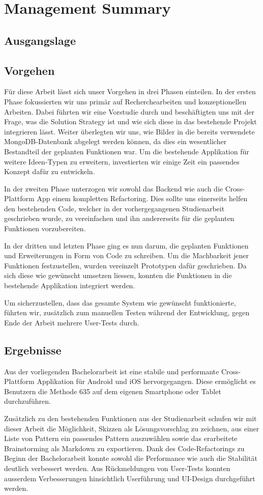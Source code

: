 \section{Management Summary}

\subsection{Ausgangslage}

\subsection{Vorgehen}
Für diese Arbeit lässt sich unser Vorgehen in drei Phasen einteilen. In der ersten Phase fokussierten wir uns primär auf Recherchearbeiten und konzeptionellen Arbeiten. Dabei führten wir eine Vorstudie durch und beschäftigten uns mit der Frage, was die Solution Strategy ist und wie sich diese in das bestehende Projekt integrieren lässt. Weiter überlegten wir uns, wie Bilder in die bereits verwendete MongoDB-Datenbank abgelegt werden können, da dies ein wesentlicher Bestandteil der geplanten Funktionen war. Um die bestehende Applikation für weitere Ideen-Typen zu erweitern, investierten wir einige Zeit ein passendes Konzept dafür zu entwickeln.

In der zweiten Phase unterzogen wir sowohl das Backend wie auch die Cross-Plattform App einem kompletten Refactoring. Dies sollte uns einerseits helfen den bestehenden Code, welcher in der vorhergegangenen Studienarbeit geschrieben wurde, zu vereinfachen und ihn andererseits für die geplanten Funktionen vorzubereiten.

In der dritten und letzten Phase ging es nun darum, die geplanten Funktionen und Erweiterungen in Form von Code zu schreiben. Um die Machbarkeit jener Funktionen festzustellen, wurden vereinzelt Prototypen dafür geschrieben. Da sich diese wie gewünscht umsetzen liessen, konnten die Funktionen in die bestehende Applikation integriert werden. 

Um sicherzustellen, dass das gesamte System wie gewünscht funktionierte, führten wir, zusätzlich zum manuellen Testen während der Entwicklung, gegen Ende der Arbeit mehrere User-Tests durch.

\subsection{Ergebnisse}
Aus der vorliegenden Bachelorarbeit ist eine stabile und performante Cross-Plattform Applikation für Android und iOS hervorgegangen. Diese ermöglicht es Benutzern die Methode 635 auf dem eigenen Smartphone oder Tablet durchzuführen.

Zusätzlich zu den bestehenden Funktionen aus der Studienarbeit schufen wir mit dieser Arbeit die Möglichkeit, Skizzen als Lösungsvorschlag zu zeichnen, aus einer Liste von Pattern ein passendes Pattern auszuwählen sowie das erarbeitete Brainstorming als Markdown zu exportieren. Dank des Code-Refactorings zu Beginn der Bachelorarbeit konnte sowohl die Performance wie auch die Stabilität deutlich verbessert werden. Aus Rückmeldungen von User-Tests konnten ausserdem Verbesserungen hinsichtlich Userführung und UI-Design durchgeführt werden.